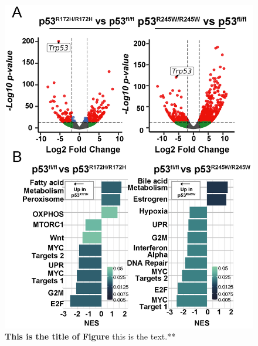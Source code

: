 \begin{figure}
\hypertarget{fig:04}{%
\centering
\includegraphics[width=1\textwidth,height=\textheight]{images/p539.png}
\caption{\textbf{This is the title of Figure} this is the text.**}\label{fig:04}
}
\end{figure}

